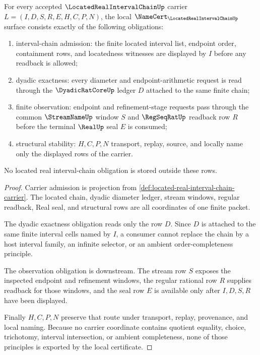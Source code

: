 \begin{theorem}
\label{thm:located-real-interval-chain-namecert-obligations}
For every accepted $\LocatedRealIntervalChainUp$ carrier $L=(I,D,S,R,E,H,C,P,N)$, the local $\NameCert_{\LocatedRealIntervalChainUp}$ surface consists exactly of the following obligations:
\begin{enumerate}
\item interval-chain admission: the finite located interval list, endpoint order, containment rows, and locatedness witnesses are displayed by $I$ before any readback is allowed;
\item dyadic exactness: every diameter and endpoint-arithmetic request is read through the $\DyadicRatCoreUp$ ledger $D$ attached to the same finite chain;
\item finite observation: endpoint and refinement-stage requests pass through the common $\StreamNameUp$ window $S$ and $\RegSeqRatUp$ readback row $R$ before the terminal $\RealUp$ seal $E$ is consumed;
\item structural stability: $H,C,P,N$ transport, replay, source, and locally name only the displayed rows of the carrier.
\end{enumerate}
No located real interval-chain obligation is stored outside these rows.
\end{theorem}
\begin{proof}
Carrier admission is projection from \autoref{def:located-real-interval-chain-carrier}. The located chain, dyadic diameter ledger, stream windows, regular readback, Real seal, and structural rows are all coordinates of one finite packet.

The dyadic exactness obligation reads only the row $D$. Since $D$ is attached to the same finite interval cells named by $I$, a consumer cannot replace the chain by a host interval family, an infinite selector, or an ambient order-completeness principle.

The observation obligation is downstream. The stream row $S$ exposes the inspected endpoint and refinement windows, the regular rational row $R$ supplies readback for those windows, and the seal row $E$ is available only after $I,D,S,R$ have been displayed.

Finally $H,C,P,N$ preserve that route under transport, replay, provenance, and local naming. Because no carrier coordinate contains quotient equality, choice, trichotomy, interval intersection, or ambient completeness, none of those principles is exported by the local certificate.
\end{proof}

